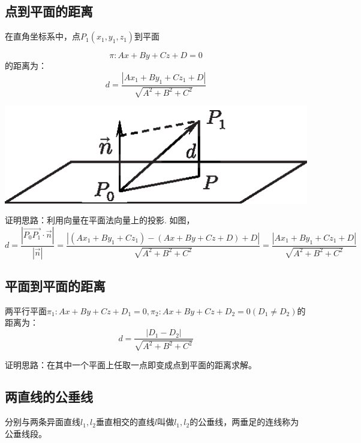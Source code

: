 \subsection{点到平面的距离}
\ttheorem[点到平面的距离]
\quad 在{\color{dy}直角坐标系}中，点$P_1(x_1,y_1,z_1)$到平面\\
\begin{minipage}{0.6\linewidth}
	$$\pi : Ax+By+Cz+D=0$$
	的距离为：
	\begin{equation}
	d=\frac{\left| Ax_1+By_1+Cz_1+D\right| }{\sqrt{A^2+B^2+C^2}}
	\end{equation}
\end{minipage}
\hfill
\begin{minipage}{0.4\linewidth}
	\centering
	\includegraphics[scale=1]{picture/C-2/2.5/point.eps}
\end{minipage}
证明思路：利用向量在平面法向量上的投影. 如图，
$$d=\frac{\left| \overrightarrow{P_0P_1} \cdot \overrightarrow{n}\right| }{\left| \overrightarrow{n}\right| }=\frac{|(Ax_1+By_1+Cz_1)-(Ax+By+Cz+D)+D|}{\sqrt{A^2+B^2+C^2}}=\frac{\left| Ax_1+By_1+Cz_1+D\right| }{\sqrt{A^2+B^2+C^2}}$$



\subsection{平面到平面的距离}
\ttheorem[平面到平面的距离]
\quad 两平行平面$\pi _1:Ax+By+Cz+D_1=0,\pi _2:Ax+By+Cz+D_2=0(D_1 \neq D_2)$的距离为：
\begin{equation}
d=\frac{\left| D_1-D_2\right| }{\sqrt{A^2+B^2+C^2}}
\end{equation}

证明思路：在其中一个平面上任取一点即变成点到平面的距离求解。
\subsection{两直线的公垂线}
\tdefination[公垂线段]
分别与两条异面直线$l_1,l_2$垂直相交的直线$l$叫做$l_1,l_2$的公垂线，两垂足的连线称为公垂线段。


